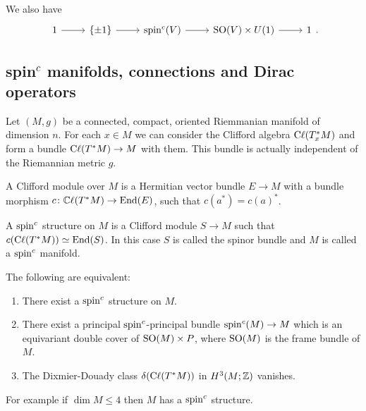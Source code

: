 \noindent We also have $$\begin{tikzcd}1\arrow[r] & \{\pm 1\}\arrow[r] & \spinc(V)\arrow[r] & \SO(V)\times U(1) \arrow[r] & 1\end{tikzcd}.$$

\subsection{spin$^c$ manifolds, connections and Dirac operators}
Let $(M,g)$ be a connected, compact, oriented Riemmanian manifold of dimension $n$. For each $x\in M$ we can consider the Clifford algebra $\mathrm{C}\ell(T^\ast_xM)$ and form a bundle $\mathrm{C}\ell(T^\ast M)\to M$ with them. This bundle is actually independent of the Riemannian metric $g$.

\begin{definition}
 A Clifford module over $M$ is a Hermitian vector bundle $E\to M$ with a bundle morphism $c\colon\mathbb{C}\ell(T^\ast M)\to\mathrm{End}(E)$, such that $c(a^\ast)=c(a)^\ast$.
\end{definition}

\begin{definition}
 A $\mathrm{spin}^c$ structure on $M$ is a Clifford module $S\to M$ such that $c(\mathrm{C}\ell(T^\ast M))\simeq\mathrm{End}(S)$. In this case $S$ is called the spinor bundle and $M$ is called a $\mathrm{spin}^c$ manifold.
\end{definition}

\begin{theorem}
 The following are equivalent:
 \begin{enumerate}
  \item There exist a $\mathrm{spin}^c$ structure on $M$.
  \item There exist a principal $\mathrm{spin}^c$-principal bundle $\mathrm{spin}^c(M)\to M$ which is an equivariant double cover of $\mathrm{SO}(M)\times P$, where $\mathrm{SO}(M)$ is the frame bundle of $M$.
  \item The Dixmier-Douady class $\delta(\mathrm{C}\ell(T^\ast M))$ in $H^3(M;\mathbb{Z})$ vanishes.
 \end{enumerate}

 \noindent For example if $\dim M\leq 4$ then $M$ has a $\mathrm{spin}^c$ structure.
\end{theorem}

